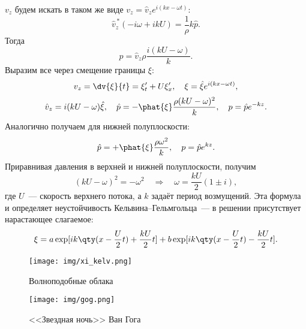 $v_z$ будем искать в таком же виде $v_z=\hat{v}_z e^{i(kx-\omega t)}$:
\begin{equation}
    \hat{v}_z^{\,*} (-i\omega +ikU) = \frac{1}{\rho}k \hat{p}.
\end{equation}
Тогда
\begin{equation}
    \hat{p} = \hat{v}_z \rho \frac{i(kU-\omega)}{k}.
\end{equation}
Выразим все через смещение границы $\xi$:
\begin{equation}
    v_z = \dv{\xi}{t} = \xi'_t + U \xi'_x, \quad
    \xi = \hat{\xi} e^{i(kx-\omega t)},
\end{equation}
\begin{equation}
    \hat{v}_z = i(kU-\omega)\hat{\xi}, \quad
    \hat{p} = -\phat{\xi} \frac{\rho(kU-\omega)^2}{k}, \quad
        p = \hat{p} e^{-kz}.
\end{equation}
Аналогично получаем для нижней полуплоскости:
\begin{equation}
   \hat{p} = +\phat{\xi} \frac{\rho \omega^2}{k}, \quad
   p = \hat{p} e^{kz}.
\end{equation}
Приравнивая давления в верхней и нижней полуплоскости, получим
\begin{equation}
    (kU-\omega)^2 = -\omega^2
    \quad\Rightarrow\quad
    \omega = \frac{kU}{2}(1\pm i),
\end{equation}
где $U$~--- скорость верхнего потока, а $k$ задаёт период возмущений.
Эта формула и определяет неустойчивость Кельвина--Гельмгольца~--- в решении присутствует нарастающее слагаемое:
\begin{equation}
    \xi = a \exp[
        ik \qty(x-\frac{U}{2}t) + \frac{kU}{2}t
    ]+b\exp[
        ik \qty(x-\frac{U}{2}t) - \frac{kU}{2}t
    ].
\end{equation}

\begin{figure}[H]
    \begin{minipage}[h]{0.48\linewidth}
        \centering
        \texttt{[image: img/xi\_kelv.png]}
        \caption{Волноподобные облака}
        \label{fig:xi_kelv}
    \end{minipage}
    \hfill
    \begin{minipage}[h]{0.48\linewidth}
        \centering
        \texttt{[image: img/gog.png]}
        \caption{<<Звездная ночь>> Ван Гога}
        \label{fig:gog}
    \end{minipage}
\end{figure}

